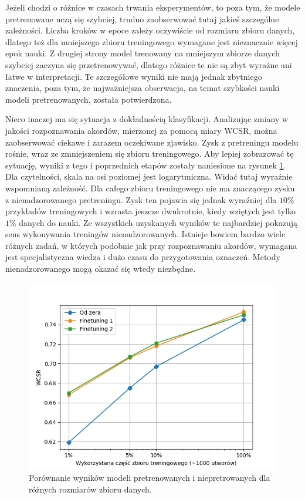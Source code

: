 Jeżeli chodzi o różnice w czasach trwania eksperymentów, to poza tym, że modele pretrenowane uczą się szybciej, trudno zaobserwować tutaj jakieś szczególne zależności. Liczba kroków w epoce zależy oczywiście od rozmiaru zbioru danych, dlatego też dla mniejszego zbioru treningowego wymagane jest nieznacznie więcej epok nauki. Z drugiej strony model trenowany na mniejszym zbiorze danych szybciej zaczyna się przetrenowywać, dlatego różnice te nie są zbyt wyraźne ani łatwe w interpretacji. Te szczegółowe wyniki nie mają jednak zbytniego znaczenia, poza tym, że najważniejsza obserwacja, na temat szybkości nauki modeli pretrenowanych, została potwierdzona.

Nieco inaczej ma się sytuacja z dokładnością klasyfikacji. Analizując zmiany w jakości rozpoznawania akordów, mierzonej za pomocą miary WCSR, można zaobserwować ciekawe i zarazem oczekiwane zjawisko. Zysk z pretreningu modelu rośnie, wraz ze zmniejszeniem się zbioru treningowego. Aby lepiej zobrazować tę sytuację, wyniki z tego i poprzednich etapów zostały naniesione na rysunek \ref{fig:final_results}. Dla czytelności, skala na osi poziomej jest logarytmiczna. Widać tutaj wyraźnie wspomnianą zależność. Dla całego zbioru treningowego nie ma znaczącego zysku z nienadzorowanego pretreningu. Zysk ten pojawia się jednak wyraźniej dla $10\%$ przykładów treningowych i wzrasta jeszcze dwukrotnie, kiedy wziętych jest tylko $1\%$ danych do nauki. Ze wszystkich uzyskanych wyników te najbardziej pokazują sens wykonywania treningów nienadzorowanych. Istnieje bowiem bardzo wiele różnych zadań, w których podobnie jak przy rozpoznawaniu akordów, wymagana jest specjalistyczna wiedza i dużo czasu do przygotowania oznaczeń. Metody nienadzorowanego mogą okazać się wtedy niezbędne.

\begin{figure}
    \centering
    \includegraphics[width=1.0\textwidth]{images/final_results.png}
    \caption{Porównanie wyników modeli pretrenowanych i niepretrowanych dla różnych rozmiarów zbioru danych.}
    \label{fig:final_results}
\end{figure}
